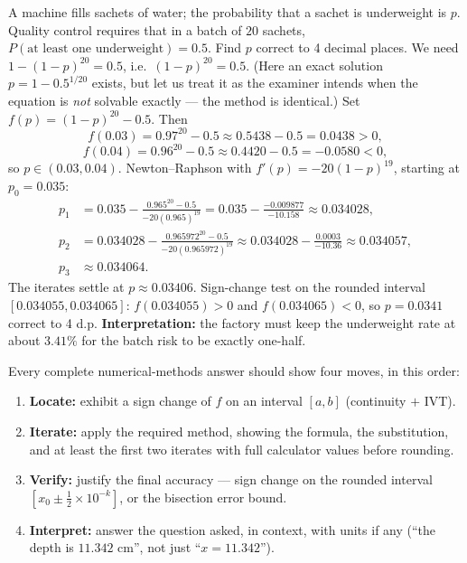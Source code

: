 \documentclass[11pt]{article}
\newcounter{popsec}
\newcounter{popsub}
\newcommand{\courssub}[1]{%
  \stepcounter{popsub}%
  \par\vspace{9pt}\noindent{\popxbold\fontsize{11.5}{13}\selectfont\color{popink}{\color{poporange}\thepopsec.\thepopsub}\hspace{6pt}#1}\par\nopagebreak\vspace{4pt}
}
\begin{document}
\begin{exoresolu}
A machine fills sachets of water; the probability that a sachet is underweight is $p$. Quality control requires that in a batch of $20$ sachets, $P(\text{at least one underweight}) = 0.5$. Find $p$ correct to 4 decimal places.
\tcblower
We need $1-(1-p)^{20} = 0.5$, i.e.\ $(1-p)^{20} = 0.5$. (Here an exact solution $p = 1 - 0.5^{1/20}$ exists, but let us treat it as the examiner intends when the equation is \emph{not} solvable exactly --- the method is identical.) Set $f(p) = (1-p)^{20} - 0.5$. Then
\[ f(0.03) = 0.97^{20} - 0.5 \approx 0.5438 - 0.5 = 0.0438 > 0, \]
\[ f(0.04) = 0.96^{20} - 0.5 \approx 0.4420 - 0.5 = -0.0580 < 0, \]
so $p \in (0.03, 0.04)$. Newton--Raphson with $f'(p) = -20(1-p)^{19}$, starting at $p_0 = 0.035$:
\begin{align*}
p_1 &= 0.035 - \frac{0.965^{20}-0.5}{-20(0.965)^{19}} = 0.035 - \frac{-0.009877}{-10.158} \approx 0.034028,\\
p_2 &= 0.034028 - \frac{0.965972^{20}-0.5}{-20(0.965972)^{19}} \approx 0.034028 - \frac{0.0003}{-10.36} \approx 0.034057,\\
p_3 &\approx 0.034064.
\end{align*}
The iterates settle at $p \approx 0.03406$. Sign-change test on the rounded interval $[0.034055, 0.034065]$: $f(0.034055) > 0$ and $f(0.034065) < 0$, so $p = 0.0341$ correct to 4 d.p. \textbf{Interpretation:} the factory must keep the underweight rate at about $3.41\%$ for the batch risk to be exactly one-half.
\end{exoresolu}

\courssub{Full GCE-Style Synthesis}

\begin{methode}
Every complete numerical-methods answer should show four moves, in this order:
\begin{enumerate}
\item \textbf{Locate:} exhibit a sign change of $f$ on an interval $[a,b]$ (continuity $+$ IVT).
\item \textbf{Iterate:} apply the required method, showing the formula, the substitution, and at least the first two iterates with full calculator values before rounding.
\item \textbf{Verify:} justify the final accuracy --- sign change on the rounded interval $[x_0 \pm \frac12\times10^{-k}]$, or the bisection error bound.
\item \textbf{Interpret:} answer the question asked, in context, with units if any (``the depth is $11.342$ cm'', not just ``$x = 11.342$'').
\end{enumerate}
\end{methode}
\end{document}
